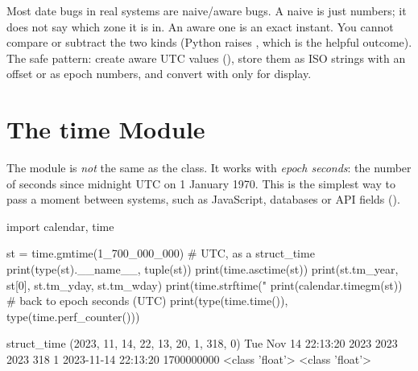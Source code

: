 \begin{boss}
Most date bugs in real systems are naive/aware bugs. A naive  is just numbers; it
does not say which zone it is in. An aware one is an exact instant. You cannot compare or subtract
the two kinds (Python raises , which is the helpful outcome). The safe pattern:
create aware UTC values (), store them as ISO strings with an
offset or as epoch numbers, and convert with  only for display.
\end{boss}

\section{The time Module}

The  module is \emph{not} the same as the  class. It works with
\emph{epoch seconds}: the number of seconds since midnight UTC on 1 January 1970. This is the
simplest way to pass a moment between systems, such as JavaScript, databases or API fields
().

\begin{center}
\end{center}

\begin{pycode}
import calendar, time

st = time.gmtime(1_700_000_000)          # UTC, as a struct_time
print(type(st).__name__, tuple(st))
print(time.asctime(st))
print(st.tm_year, st[0], st.tm_yday, st.tm_wday)
print(time.strftime("%
print(calendar.timegm(st))               # back to epoch seconds (UTC)
print(type(time.time()), type(time.perf_counter()))
\end{pycode}
\begin{rawcode}
struct_time (2023, 11, 14, 22, 13, 20, 1, 318, 0)
Tue Nov 14 22:13:20 2023
2023 2023 318 1
2023-11-14 22:13:20
1700000000
<class 'float'> <class 'float'>
\end{rawcode}

